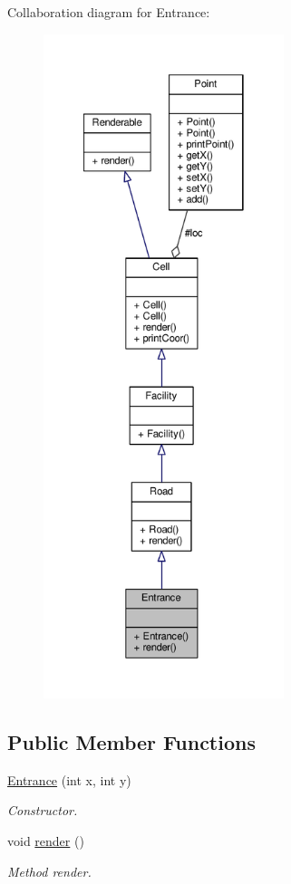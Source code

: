 Collaboration diagram for Entrance\+:
\nopagebreak
\begin{figure}[H]
\begin{center}
\leavevmode
\includegraphics[height=550pt]{classEntrance__coll__graph}
\end{center}
\end{figure}
\subsection*{Public Member Functions}
\begin{DoxyCompactItemize}
\item 
\hyperlink{classEntrance_acfb8b9f5d174b102562ee8989b8e20d4}{Entrance} (int x, int y)
\begin{DoxyCompactList}\small\item\em Constructor. \end{DoxyCompactList}\item 
void \hyperlink{classEntrance_afdd36c728c4ed589eed3e7bebb73d070}{render} ()\hypertarget{classEntrance_afdd36c728c4ed589eed3e7bebb73d070}{}\label{classEntrance_afdd36c728c4ed589eed3e7bebb73d070}

\begin{DoxyCompactList}\small\item\em Method render. \end{DoxyCompactList}\end{DoxyCompactItemize}
